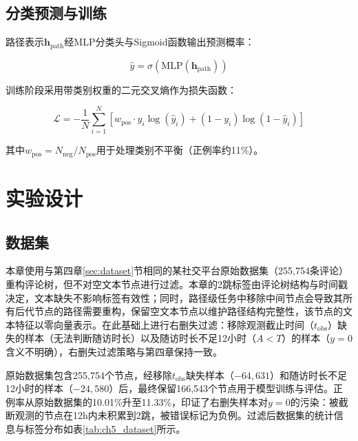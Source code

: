 \subsection{分类预测与训练}

路径表示$\mathbf{h}_{\text{path}}$经MLP分类头与Sigmoid函数输出预测概率：

\begin{equation}
\hat{y} = \sigma(\text{MLP}(\mathbf{h}_{\text{path}}))
\end{equation}

训练阶段采用带类别权重的二元交叉熵作为损失函数：

\begin{equation}
\mathcal{L} = -\frac{1}{N} \sum_{i=1}^{N} \left[ w_{\text{pos}} \cdot y_i \log(\hat{y}_i) + (1 - y_i) \log(1 - \hat{y}_i) \right]
\end{equation}

其中$w_{\text{pos}} = N_{\text{neg}} / N_{\text{pos}}$用于处理类别不平衡（正例率约11\%）。

\section{实验设计}

\subsection{数据集}

本章使用与第四章\ref{sec:dataset}节相同的某社交平台原始数据集（255,754条评论）重构评论树，但不对空文本节点进行过滤。本章的2跳标签由评论树结构与时间戳决定，文本缺失不影响标签有效性；同时，路径级任务中移除中间节点会导致其所有后代节点的路径需要重构，保留空文本节点以维护路径结构完整性，该节点的文本特征以零向量表示。在此基础上进行右删失过滤：移除观测截止时间（$t_{\text{obs}}$）缺失的样本（无法判断随访时长）以及随访时长不足12小时（$A < T$）的样本（$y=0$含义不明确），右删失过滤策略与第四章保持一致。

原始数据集包含255,754个节点，经移除$t_{\text{obs}}$缺失样本（$-64{,}631$）和随访时长不足12小时的样本（$-24{,}580$）后，最终保留166,543个节点用于模型训练与评估。正例率从原始数据集的10.01\%升至11.33\%，印证了右删失样本对$y=0$的污染：被截断观测的节点在12h内未积累到2跳，被错误标记为负例。过滤后数据集的统计信息与标签分布如表\ref{tab:ch5_dataset}所示。

